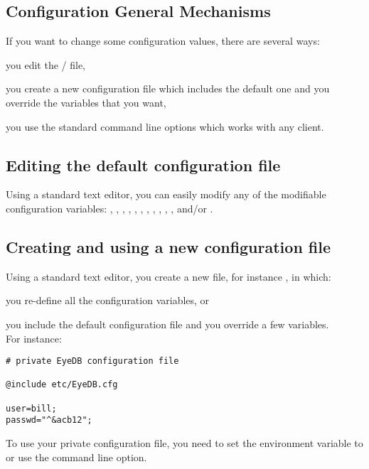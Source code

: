 \subsection{Configuration General Mechanisms}
If you want to change some configuration values, there are several
ways:
\be
\item you edit the \tdir/ file,
\item you create a new configuration file which includes the default
one and you override the variables that you want,
\item you use the standard \eyedb command line options which works
with any \eyedb client.
\ee 
\subsection{Editing the default configuration file}
Using a standard text editor, you can easily modify any of the
modifiable configuration variables: , , ,
, , , , ,
, , ,
 and/or .
\subsection{Creating and using a new configuration file}
Using a standard text editor, you create a new file, for instance
, in which:
\bi
\item you re-define all the configuration variables,
or
\item you include the default configuration file and you
override a few variables.
\\
For instance:
\verbsize
\begin{verbatim}
# private EyeDB configuration file

@include etc/EyeDB.cfg

user=bill;
passwd="^&acb12";
\end{verbatim}
\normalsize
\ei
To use your private configuration file, you need to set the environment
variable  to  or use the 
command line option.


